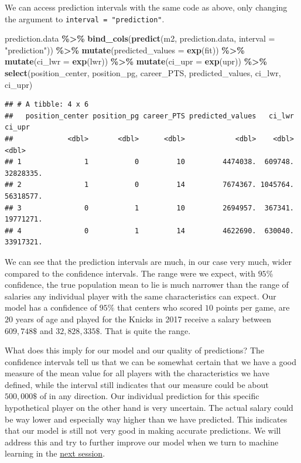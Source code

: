 \documentclass[
]{book}
\newenvironment{Shaded}{\begin{snugshade}}{\end{snugshade}}
\newcommand{\AttributeTok}[1]{\textcolor[rgb]{0.13,0.29,0.53}{#1}}
\newcommand{\FunctionTok}[1]{\textcolor[rgb]{0.13,0.29,0.53}{\textbf{#1}}}
\newcommand{\NormalTok}[1]{#1}
\newcommand{\SpecialCharTok}[1]{\textcolor[rgb]{0.81,0.36,0.00}{\textbf{#1}}}
\newcommand{\StringTok}[1]{\textcolor[rgb]{0.31,0.60,0.02}{#1}}
\begin{document}
We can access prediction intervals with the same code as above, only changing
the argument to \texttt{interval\ =\ "prediction"}.

\begin{Shaded}
\begin{Highlighting}[]
\NormalTok{prediction.data }\SpecialCharTok{\%\textgreater{}\%} 
  \FunctionTok{bind\_cols}\NormalTok{(}\FunctionTok{predict}\NormalTok{(m2, prediction.data, }\AttributeTok{interval =} \StringTok{"prediction"}\NormalTok{)) }\SpecialCharTok{\%\textgreater{}\%} 
  \FunctionTok{mutate}\NormalTok{(}\AttributeTok{predicted\_values =} \FunctionTok{exp}\NormalTok{(fit)) }\SpecialCharTok{\%\textgreater{}\%}
  \FunctionTok{mutate}\NormalTok{(}\AttributeTok{ci\_lwr =} \FunctionTok{exp}\NormalTok{(lwr)) }\SpecialCharTok{\%\textgreater{}\%}
  \FunctionTok{mutate}\NormalTok{(}\AttributeTok{ci\_upr =} \FunctionTok{exp}\NormalTok{(upr)) }\SpecialCharTok{\%\textgreater{}\%}
  \FunctionTok{select}\NormalTok{(position\_center, position\_pg, career\_PTS, predicted\_values, ci\_lwr, ci\_upr)}
\end{Highlighting}
\end{Shaded}

\begin{verbatim}
## # A tibble: 4 x 6
##   position_center position_pg career_PTS predicted_values   ci_lwr    ci_upr
##             <dbl>       <dbl>      <dbl>            <dbl>    <dbl>     <dbl>
## 1               1           0         10         4474038.  609748. 32828335.
## 2               1           0         14         7674367. 1045764. 56318577.
## 3               0           1         10         2694957.  367341. 19771271.
## 4               0           1         14         4622690.  630040. 33917321.
\end{verbatim}

We can see that the prediction intervals are much, in our case very much, wider
compared to the confidence intervals. The range were we expect, with \(95\%\)
confidence, the true population mean to lie is much narrower than the range of
salaries any individual player with the same characteristics can expect.
Our model has a confidence of \(95\%\) that centers who scored \(10\) points per
game, are \(20\) years of age and played for the Knicks in 2017 receive a salary
between \(609,748\$\) and \(32,828,335\$\). That is quite the range.

What does this imply for our model and our quality of predictions?
The confidence intervals tell us that we can be somewhat certain that we have a
good measure of the mean value for all players with the characteristics we have
defined, while the interval still indicates that our measure could be about
\(500,000\$\) of in any direction.
Our individual prediction for this specific hypothetical player on the other
hand is very uncertain.
The actual salary could be way lower and especially way higher than we have
predicted. This indicates that our model is still not very good in making
accurate predictions. We will address this and try to further improve our model
when we turn to machine learning in the \protect\hyperlink{ml}{next session}.
\end{document}
